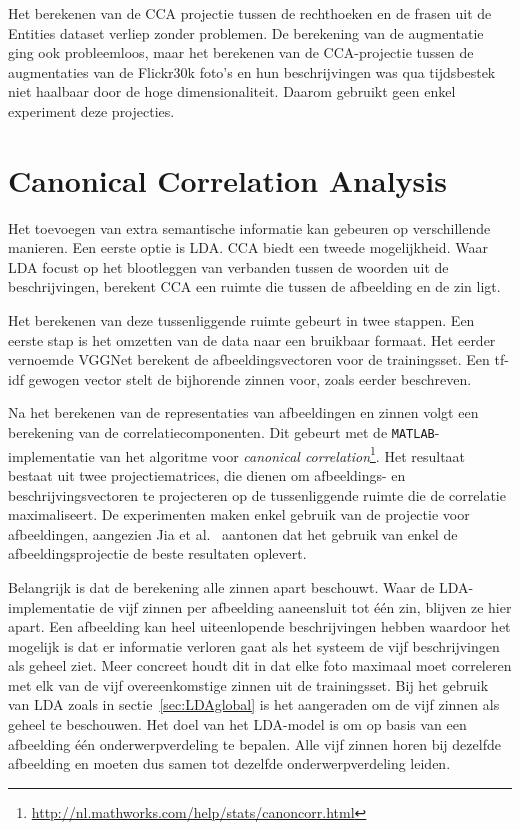 Het berekenen van de CCA projectie tussen de rechthoeken en de frasen uit de Entities dataset verliep zonder problemen. De berekening van de augmentatie ging ook probleemloos, maar het berekenen van de CCA-projectie tussen de augmentaties van de Flickr30k foto's en hun beschrijvingen was qua tijdsbestek niet haalbaar door de hoge dimensionaliteit. Daarom gebruikt geen enkel experiment deze projecties. 

\section{Canonical Correlation Analysis}
Het toevoegen van extra semantische informatie kan gebeuren op verschillende manieren. Een eerste optie is LDA. CCA biedt een tweede mogelijkheid. Waar LDA focust op het blootleggen van verbanden tussen de woorden uit de beschrijvingen, berekent CCA een ruimte die tussen de afbeelding en de zin ligt.

Het berekenen van deze tussenliggende ruimte gebeurt in twee stappen. Een eerste stap is het omzetten van de data naar een bruikbaar formaat. Het eerder vernoemde VGGNet berekent de afbeeldingsvectoren voor de trainingsset. Een tf-idf gewogen vector stelt de bijhorende zinnen voor, zoals eerder beschreven. 

Na het berekenen van de representaties van afbeeldingen en zinnen volgt een berekening van de correlatiecomponenten. Dit gebeurt met de \texttt{MATLAB}-implementatie van het algoritme voor \emph{canonical correlation}\footnote{\url{http://nl.mathworks.com/help/stats/canoncorr.html}}. Het resultaat bestaat uit twee projectiematrices, die dienen om afbeeldings- en beschrijvingsvectoren te projecteren op de tussenliggende ruimte die de correlatie maximaliseert. De experimenten maken enkel gebruik van de projectie voor afbeeldingen, aangezien Jia et al.~\cite{Fernando2015} aantonen dat het gebruik van enkel de afbeeldingsprojectie de beste resultaten oplevert.

Belangrijk is dat de berekening alle zinnen apart beschouwt. Waar de LDA-implementatie de vijf zinnen per afbeelding aaneensluit tot \'e\'en zin, blijven ze hier apart. Een afbeelding kan heel uiteenlopende beschrijvingen hebben waardoor het mogelijk is dat er informatie verloren gaat als het systeem de vijf beschrijvingen als geheel ziet. Meer concreet houdt dit in dat elke foto maximaal moet correleren met elk van de vijf overeenkomstige zinnen uit de trainingsset. Bij het gebruik van LDA zoals in sectie~\ref{sec:LDAglobal} is het aangeraden om de vijf zinnen als geheel te beschouwen. Het doel van het LDA-model is om op basis van een afbeelding \'e\'en onderwerpverdeling te bepalen. Alle vijf zinnen horen bij dezelfde afbeelding en moeten dus samen tot dezelfde onderwerpverdeling leiden.

